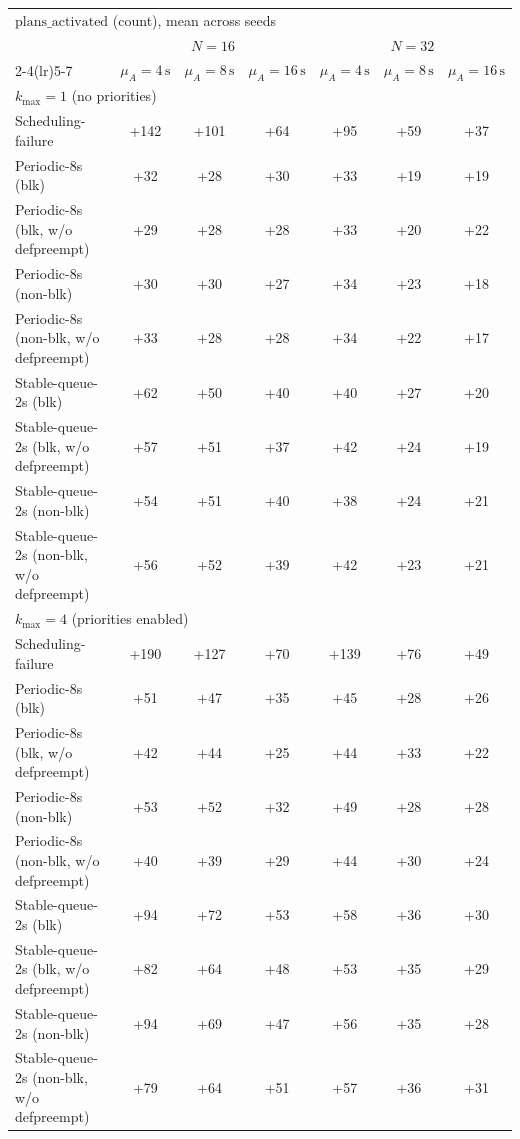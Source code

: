 \begin{tabular}{l c c c c c c}
\toprule
\multicolumn{7}{l}{$\mathbf{\mathrm{plans\_activated}}$ (count), mean across seeds} \\
\addlinespace[0.2em]
& \multicolumn{3}{c}{$N=16$} & \multicolumn{3}{c}{$N=32$} \\
\cmidrule(lr){2-4}\cmidrule(lr){5-7}
& $\mu_A{=}4\,\mathrm{s}$ & $\mu_A{=}8\,\mathrm{s}$ & $\mu_A{=}16\,\mathrm{s}$ & $\mu_A{=}4\,\mathrm{s}$ & $\mu_A{=}8\,\mathrm{s}$ & $\mu_A{=}16\,\mathrm{s}$ \\
\midrule
\multicolumn{7}{l}{$k_{\max}=1$ (no priorities)} \\
\midrule
Scheduling-failure & +142 & +101 & +64 & +95 & +59 & +37 \\
Periodic-8s (blk) & +32 & +28 & +30 & +33 & +19 & +19 \\
Periodic-8s (blk, w/o defpreempt) & +29 & +28 & +28 & +33 & +20 & +22 \\
Periodic-8s (non-blk) & +30 & +30 & +27 & +34 & +23 & +18 \\
Periodic-8s (non-blk, w/o defpreempt) & +33 & +28 & +28 & +34 & +22 & +17 \\
Stable-queue-2s (blk) & +62 & +50 & +40 & +40 & +27 & +20 \\
Stable-queue-2s (blk, w/o defpreempt) & +57 & +51 & +37 & +42 & +24 & +19 \\
Stable-queue-2s (non-blk) & +54 & +51 & +40 & +38 & +24 & +21 \\
Stable-queue-2s (non-blk, w/o defpreempt) & +56 & +52 & +39 & +42 & +23 & +21 \\
\midrule
\multicolumn{7}{l}{$k_{\max}=4$ (priorities enabled)} \\
\midrule
Scheduling-failure & +190 & +127 & +70 & +139 & +76 & +49 \\
Periodic-8s (blk) & +51 & +47 & +35 & +45 & +28 & +26 \\
Periodic-8s (blk, w/o defpreempt) & +42 & +44 & +25 & +44 & +33 & +22 \\
Periodic-8s (non-blk) & +53 & +52 & +32 & +49 & +28 & +28 \\
Periodic-8s (non-blk, w/o defpreempt) & +40 & +39 & +29 & +44 & +30 & +24 \\
Stable-queue-2s (blk) & +94 & +72 & +53 & +58 & +36 & +30 \\
Stable-queue-2s (blk, w/o defpreempt) & +82 & +64 & +48 & +53 & +35 & +29 \\
Stable-queue-2s (non-blk) & +94 & +69 & +47 & +56 & +35 & +28 \\
Stable-queue-2s (non-blk, w/o defpreempt) & +79 & +64 & +51 & +57 & +36 & +31 \\
\bottomrule
\end{tabular}
